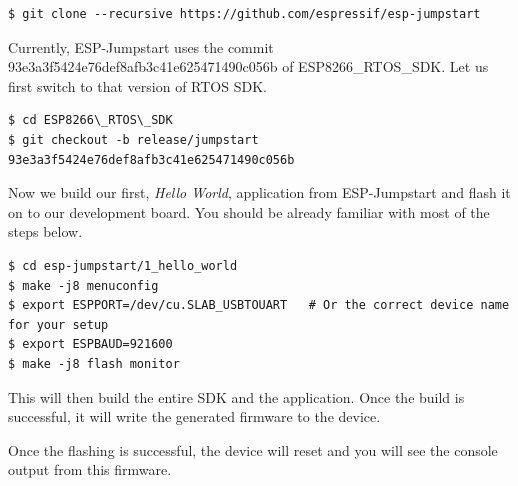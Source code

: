 \documentclass[main.tex]{subfiles}
\begin{document}
\begin{verbatim}
$ git clone --recursive https://github.com/espressif/esp-jumpstart
\end{verbatim}

Currently, ESP-Jumpstart uses the commit 93e3a3f5424e76def8afb3c41e625471490c056b of ESP8266\_RTOS\_SDK. Let us first switch to that version of RTOS SDK.
\begin{verbatim}
$ cd ESP8266\_RTOS\_SDK
$ git checkout -b release/jumpstart 93e3a3f5424e76def8afb3c41e625471490c056b
\end{verbatim}

Now we build our first, \textit{Hello World}, application from ESP-Jumpstart and flash it on to our development board. You should be already familiar with most of the steps below.

\begin{verbatim}
$ cd esp-jumpstart/1_hello_world
$ make -j8 menuconfig
$ export ESPPORT=/dev/cu.SLAB_USBTOUART   # Or the correct device name for your setup
$ export ESPBAUD=921600
$ make -j8 flash monitor
\end{verbatim}

This will then build the entire SDK and the application. Once the build is successful, it will write the generated firmware to the device.

Once the flashing is successful, the device will reset and you will see the console output from this firmware.
\end{document}
